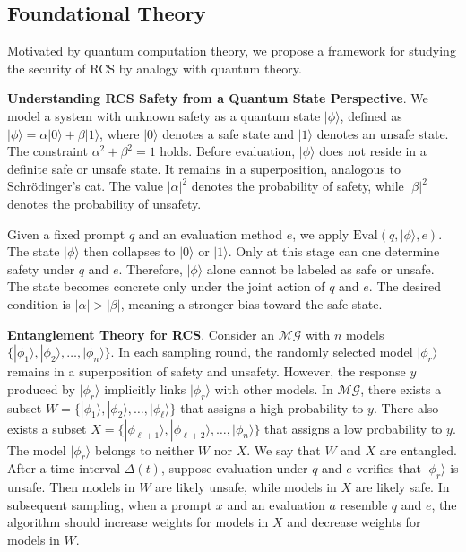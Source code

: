 \documentclass[11pt]{article}
\begin{document}
\subsection{Foundational Theory}
\label{sec:Theory}
\noindent
Motivated by quantum computation theory, we propose a framework for studying the security of RCS by analogy with quantum theory.

\noindent
\textbf{Understanding RCS Safety from a Quantum State Perspective}. 
We model a system with unknown safety as a quantum state $|\phi\rangle$, defined as
$|\phi\rangle = \alpha |0\rangle + \beta |1\rangle$,
where $|0\rangle$ denotes a safe state and $|1\rangle$ denotes an unsafe state. The constraint $\alpha^2 + \beta^2 = 1$ holds. Before evaluation, $|\phi\rangle$ does not reside in a definite safe or unsafe state. It remains in a superposition, analogous to Schr\"odinger's cat. The value $|\alpha|^2$ denotes the probability of safety, while $|\beta|^2$ denotes the probability of unsafety.

Given a fixed prompt $q$ and an evaluation method $e$, we apply $\mathrm{Eval}(q, |\phi\rangle, e)$. The state $|\phi\rangle$ then collapses to $|0\rangle$ or $|1\rangle$. Only at this stage can one determine safety under $q$ and $e$. Therefore, $|\phi\rangle$ alone cannot be labeled as safe or unsafe. The state becomes concrete only under the joint action of $q$ and $e$. The desired condition is $|\alpha| > |\beta|$, meaning a stronger bias toward the safe state.

\noindent
\textbf{Entanglement Theory for RCS}. Consider an $\mathcal{MG}$ with $n$ models $\{|\phi_1\rangle, |\phi_2\rangle, \dots, |\phi_n\rangle\}$. In each sampling round, the randomly selected model $|\phi_r\rangle$ remains in a superposition of safety and unsafety. However, the response $y$ produced by $|\phi_r\rangle$ implicitly links $|\phi_r\rangle$ with other models. In $\mathcal{MG}$, there exists a subset
$W = \{|\phi_1\rangle, |\phi_2\rangle, \dots, |\phi_\ell\rangle\}$
that assigns a high probability to $y$. There also exists a subset
$X = \{|\phi_{\ell+1}\rangle, |\phi_{\ell+2}\rangle, \dots, |\phi_n\rangle\}$
that assigns a low probability to $y$. The model $|\phi_r\rangle$ belongs to neither $W$ nor $X$. We say that $W$ and $X$ are entangled. After a time interval $\Delta(t)$, suppose evaluation under $q$ and $e$ verifies that $|\phi_r\rangle$ is unsafe. Then models in $W$ are likely unsafe, while models in $X$ are likely safe. In subsequent sampling, when a prompt $x$ and an evaluation $a$ resemble $q$ and $e$, the algorithm should increase weights for models in $X$ and decrease weights for models in $W$.
\end{document}

